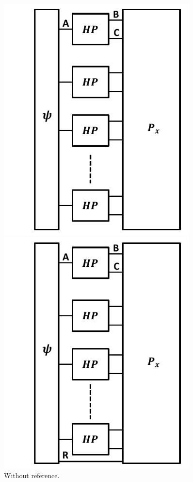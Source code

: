 \documentclass[a4paper,11pt]{article}
\begin{document}
\begin{figure}
	\centering
	\begin{minipage}{0.45\textwidth}
		\centering
		\includegraphics[width=0.9\textwidth]{pics/parallel-strategy-without-reference}
		\caption{Without reference.}
		\label{circ:parallel-strategy-without-reference}
	\end{minipage}\hfill
	\begin{minipage}{0.45\textwidth}
		\centering
		\includegraphics[width=0.9\textwidth]{pics/parallel-strategy-with-reference}

\end{minipage}
\end{figure}
\end{document}
